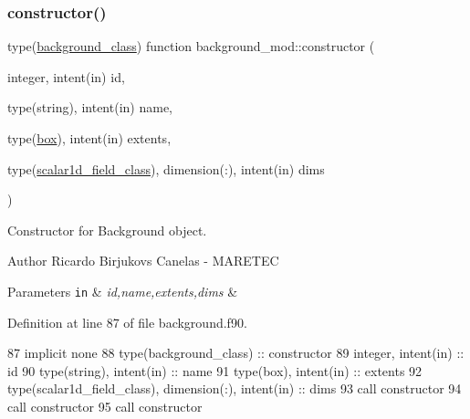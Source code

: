 \subsubsection{\texorpdfstring{constructor()}{constructor()}}
{\footnotesize\ttfamily type(\mbox{\hyperlink{structbackground__mod_1_1background__class}{background\+\_\+class}}) function background\+\_\+mod\+::constructor (\begin{DoxyParamCaption}\item[{integer, intent(in)}]{id,  }\item[{type(string), intent(in)}]{name,  }\item[{type(\mbox{\hyperlink{structgeometry__mod_1_1box}{box}}), intent(in)}]{extents,  }\item[{type(\mbox{\hyperlink{structfield__types__mod_1_1scalar1d__field__class}{scalar1d\+\_\+field\+\_\+class}}), dimension(\+:), intent(in)}]{dims }\end{DoxyParamCaption})\hspace{0.3cm}{\ttfamily [private]}}



Constructor for Background object. 

\begin{DoxyAuthor}{Author}
Ricardo Birjukovs Canelas -\/ M\+A\+R\+E\+T\+EC 
\end{DoxyAuthor}

\begin{DoxyParams}[1]{Parameters}
\mbox{\tt in}  & {\em id,name,extents,dims} & \\
\hline
\end{DoxyParams}


Definition at line 87 of file background.\+f90.


\begin{DoxyCode}
87     \textcolor{keywordtype}{implicit none}
88     \textcolor{keywordtype}{type}(background\_class) :: constructor
89     \textcolor{keywordtype}{integer}, \textcolor{keywordtype}{intent(in)} :: id
90     \textcolor{keywordtype}{type}(string), \textcolor{keywordtype}{intent(in)} :: name
91     \textcolor{keywordtype}{type}(box), \textcolor{keywordtype}{intent(in)} :: extents
92     \textcolor{keywordtype}{type}(scalar1d\_field\_class), \textcolor{keywordtype}{dimension(:)}, \textcolor{keywordtype}{intent(in)} :: dims
93     \textcolor{keyword}{call }constructor%
94     \textcolor{keyword}{call }constructor%
95     \textcolor{keyword}{call }constructor%
\end{DoxyCode}
\mbox{\label{namespacebackground__mod_acdcc52b4fb298bc145a121f9e8a4b929}} 
